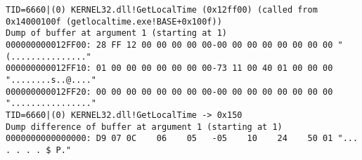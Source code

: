\begin{lstlisting}
TID=6660|(0) KERNEL32.dll!GetLocalTime (0x12ff00) (called from 0x14000100f (getlocaltime.exe!BASE+0x100f))
Dump of buffer at argument 1 (starting at 1)
000000000012FF00: 28 FF 12 00 00 00 00 00-00 00 00 00 00 00 00 00 "(..............."
000000000012FF10: 01 00 00 00 00 00 00 00-73 11 00 40 01 00 00 00 "........s..@...."
000000000012FF20: 00 00 00 00 00 00 00 00-00 00 00 00 00 00 00 00 "................"
TID=6660|(0) KERNEL32.dll!GetLocalTime -> 0x150
Dump difference of buffer at argument 1 (starting at 1)
0000000000000000: D9 07 0C    06    05   -05    10    24    50 01 "... . . . . $ P."
\end{lstlisting}








